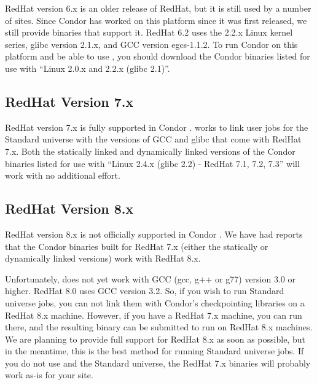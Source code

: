 RedHat version 6.x is an older release of RedHat, but it is still used
by a number of sites.
Since Condor has worked on this platform since it was first released,
we still provide binaries that support it.
RedHat 6.2 uses the 2.2.x Linux kernel series, glibc version 2.1.x,
and GCC version egcs-1.1.2.
To run Condor on this platform and be able to use ,
you should download the Condor \VersionNotice  binaries listed for use
with ``Linux 2.0.x and 2.2.x (glibc 2.1)''.


\subsection{\label{sec:platform-linux-rh7}RedHat Version 7.x}

RedHat version 7.x is fully supported in Condor \VersionNotice.
 works to link user jobs for the Standard universe
with the versions of GCC and glibc that come with RedHat 7.x.
Both the statically linked and dynamically linked versions of the
Condor binaries listed for use with ``Linux 2.4.x (glibc 2.2) - RedHat
7.1, 7.2, 7.3'' will work with no additional effort.


\subsection{\label{sec:platform-linux-rh8}RedHat Version 8.x}

RedHat version 8.x is not officially supported in Condor
\VersionNotice.
We have had reports that the Condor binaries built for RedHat 7.x
(either the statically or dynamically linked versions) work with
RedHat 8.x. 

Unfortunately,  does not yet work with GCC (gcc, g++
or g77) version 3.0 or higher.
RedHat 8.0 uses GCC version 3.2.
So, if you wish to run Standard universe jobs, you can not link them
with Condor's checkpointing libraries on a RedHat 8.x machine.
However, if you have a RedHat 7.x machine, you can run
 there, and the resulting binary can be submitted to
run on RedHat 8.x machines.
We are planning to provide full support for RedHat 8.x as soon as
possible, but in the meantime, this is the best method for running
Standard universe jobs.
If you do not use  and the Standard universe, the
RedHat 7.x binaries will probably work as-is for your site. 


